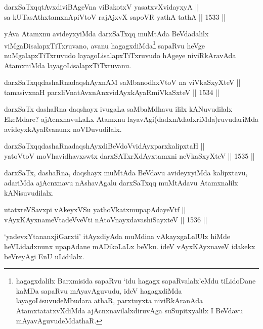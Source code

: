 \begin{shl}
darxSaTxqqtAvxdiviBAgeVna viBakotxV yasatxvXvidayxyA ||  \\
sa kUTasAthxtamxnA\s piVtoV rajAjxvX sapoVR yathA tathA \hfill || 1533 ||  
\end{shl}

\begin{artha}
yAva Atamxnu avideyxyiMda darxSaTxqq muMtAda BeVdadalilx viMgaDisalapxTiTxruvano, avanu hagagxdiMda\footnote{hagagxdalilx Barxmisida sapaRvu `idu hagagx sapaRvalalx'eMdu tiLidoDane kaMDa sapaRvu mAyavAguvudu, ideV hagagxdiMda layagoLisuvudeMbudara athaR, parxtuyxta niviRkAranAda AtamxtatatxvXdiMda ajAcnxnavilalxdiruvAga suSupitxyalilx I BeVdavu mAyavAguvudeMdathaR.} sapaRvu heVge nuMgalapxTiTxruvudo layagoLisalapxTiTxruvudo hAgeye niviRkAravAda AtamxniMda layagoLisalapxTiTxruvanu.
\end{artha}

\begin{shl}
darxSaTxqqdashaRnadaqshAyxnAM saMbanodhxV\s toV na viVkaSxyXteV || \\
tamasivxnaH parxliVnatAvxnAnxvidAyxkAyaRmiVkaSxteV \hfill || 1534 ||  
\end{shl}

\begin{artha}
darxSaTx dashaRna daqshayx ivugaLa saMbaMdhavu ililx kANuvudilalx EkeMdare? ajAcnxnavuLaLx Atamxnu layavAgi(dadxnAdadxriMda)ruvudariMda avideyxkAyaRvanunx noVDuvudilalx.
\end{artha}

\begin{shl}
darxSaTxqqdashaRnadaqshAyxdiBeVdoV\s vidAyxparxkalipxtaH || \\
yatoV\s toV moVhavidhavxswtx darxSATxrXdAyxtamxni neVkaSxyXteV \hfill || 1535 ||  
\end{shl}

\begin{artha}
darxSaTx, dashaRna, daqshayx muMtAda BeVdavu avideyxyiMda kalipxtavu, adariMda ajAcnxnavu nAshavAgalu darxSaTxqq muMtAdavu Atamxnalilx kANisuvudilalx.
\end{artha}

\begin{shl}
utatxreVSavxpi vAkeyxVSu yathoVkatxmupapAdayeVtf ||  \\
vAyxKAyxnameVtadeVveVti nAtoV\s nayxdavashiSayxteV \hfill || 1536 ||  
\end{shl}

\begin{artha}
`yadevxYtananxjiGarxti' itAyxdiyAda muMdina vAkayxgaLalUlx hiMde heVLidadxnunx upapAdane mADikoLaLx beVku. ideV vAyxKAyxnaveV idakekx beVreyAgi EnU uLidilalx.
\end{artha}

